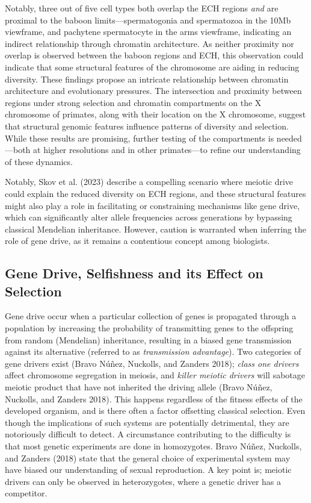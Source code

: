 \documentclass[
  11pt,
  a4paper,
]{scrbook}
\begin{document}
Notably, three out of five cell types both overlap the ECH regions
\emph{and} are proximal to the baboon limits---spermatogonia and
spermatozoa in the 10Mb viewframe, and pachytene spermatocyte in the
arms viewframe, indicating an indirect relationship through chromatin
architecture. As neither proximity nor overlap is observed between the
baboon regions and ECH, this observation could indicate that some
structural features of the chromosome are aiding in reducing diversity.
These findings propose an intricate relationship between chromatin
architecture and evolutionary pressures. The intersection and proximity
between regions under strong selection and chromatin compartments on the
X chromosome of primates, along with their location on the X chromosome,
suggest that structural genomic features influence patterns of diversity
and selection. While these results are promising, further testing of the
compartments is needed---both at higher resolutions and in other
primates---to refine our understanding of these dynamics.

Notably, Skov et al. (2023) describe a compelling scenario where meiotic
drive could explain the reduced diversity on ECH regions, and these
structural features might also play a role in facilitating or
constraining mechanisms like gene drive, which can significantly alter
allele frequencies across generations by bypassing classical Mendelian
inheritance. However, caution is warranted when inferring the role of
gene drive, as it remains a contentious concept among biologists.

\subsection{Gene Drive, Selfishness and its Effect on
Selection}\label{gene-drive-selfishness-and-its-effect-on-selection}

Gene drive occur when a particular collection of genes is propagated
through a population by increasing the probability of transmitting genes
to the offspring from random (Mendelian) inheritance, resulting in a
biased gene transmission against its alternative (referred to as
\emph{transmission advantage}). Two categories of gene drivers exist
(Bravo Núñez, Nuckolls, and Zanders 2018); \emph{class one drivers}
affect chromosome segregation in meiosis, and \emph{killer meiotic
drivers} will sabotage meiotic product that have not inherited the
driving allele (Bravo Núñez, Nuckolls, and Zanders 2018). This happens
regardless of the fitness effects of the developed organism, and is
there often a factor offsetting classical selection. Even though the
implications of such systems are potentially detrimental, they are
notoriously difficult to detect. A circumstance contributing to the
difficulty is that most genetic experiments are done in homozygotes.
Bravo Núñez, Nuckolls, and Zanders (2018) state that the general choice
of experimental system may have biased our understanding of sexual
reproduction. A key point is; meiotic drivers can only be observed in
heterozygotes, where a genetic driver has a competitor.
\end{document}
